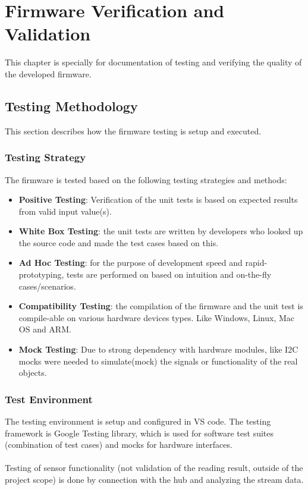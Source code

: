 \chapter{Firmware Verification and Validation}
\label{chapter:vv}
This chapter is specially for documentation of testing and verifying the quality of the developed firmware. 
\section{Testing Methodology}
This section describes how the firmware testing is setup and executed. 
\subsection{Testing Strategy}
The firmware is tested based on the following testing strategies and methods: 
\begin{itemize}
 \item \textbf{Positive Testing}: Verification of the unit tests is based on expected results from valid input value(s).
 \item \textbf{White Box Testing}: the unit tests are written by developers who looked up the source code and made the test cases based on this. 
 \item \textbf{Ad Hoc Testing}: for the purpose of development speed and rapid-prototyping, tests are performed on based on intuition and on-the-fly cases/scenarios. 
 \item \textbf{Compatibility Testing}: the compilation of the firmware and the unit test is compile-able on various hardware devices types. Like Windows, Linux, Mac OS and ARM. 
 \item \textbf{Mock Testing}: Due to strong dependency with hardware modules, like I2C mocks were needed to simulate(mock) the signals or functionality of the real objects.
\end{itemize}
\subsection{Test Environment}
The testing environment is setup and configured in VS code. The testing framework is Google Testing library, which is used for software test suites (combination of test cases) and mocks for hardware interfaces.\\\\
Testing of sensor functionality (not validation of the reading result, outside of the project scope) is done by connection with the hub and analyzing the stream data. 
